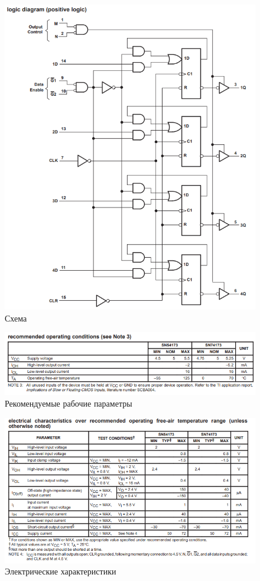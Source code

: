 \begin{figure}[H]
	\centering
	\includegraphics[width=0.95\linewidth]{imgs/10/10_sh}
	\caption{Схема}
	\label{fig:10_sh}
\end{figure}

\begin{figure}[H]
	\centering
	\includegraphics[width=0.95\linewidth]{imgs/10/10_rec}
	\caption{Рекомендуемые рабочие параметры}
	\label{fig:10_rec}
\end{figure}

\begin{figure}[H]
	\centering
	\includegraphics[width=0.95\linewidth]{imgs/10/10_ch}
	\caption{Электрические характеристики}
	\label{fig:10_ch}
\end{figure}

